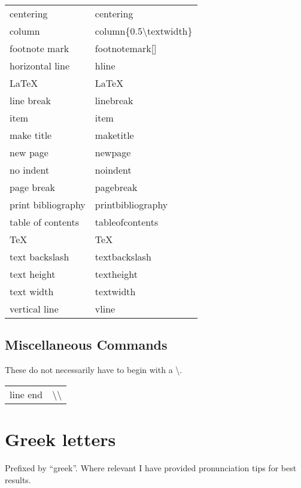 \documentclass[12pt, a4paper]{article}
\begin{document}
\begin{longtable}{ll}
centering & centering \\
column & column\{0.5\textbackslash textwidth\} \\
footnote mark & footnotemark[] \\
horizontal line & hline \\
LaTeX & \LaTeX~  \\
line break & linebreak \\
item & item \\
make title & maketitle \\
new page & newpage \\
no indent & noindent \\
page break & pagebreak \\
print bibliography & printbibliography \\
table of contents & tableofcontents \\
TeX & \TeX~  \\
text backslash & textbackslash \\
text height & textheight \\
text width & textwidth \\
vertical line & vline \\
\end{longtable}

\subsection{Miscellaneous Commands}
These do not necessarily have to begin with a \textbackslash.

\begin{longtable}{ll}
line end & \textbackslash \textbackslash \\
\end{longtable}



\section{Greek letters}
Prefixed by ``greek''. Where relevant I have provided pronunciation tips for best results.
\end{document}
